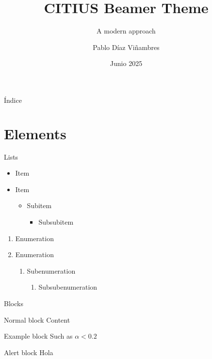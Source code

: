 \documentclass[aspectratio=169]{beamer}
\title{CITIUS Beamer Theme}
\subtitle{A modern approach}
\author{Pablo Díaz Viñambres}
\date{Junio 2025}
\def\toctitle{Índice}
\begin{document}
\begin{frame}[plain]%
    \titlepage%
\end{frame}
  
\begin{frame}[plain]{\toctitle}
    \tableofcontents
\end{frame}
\setcounter{framenumber}{0} %

\section{Elements}

\begin{frame}{Lists}
    \begin{itemize}
        \item Item 
        \item Item
        \begin{itemize}
            \item Subitem
            \begin{itemize}
                \item Subsubitem
            \end{itemize}
        \end{itemize}
    \end{itemize}
    
    \begin{enumerate}
        \item Enumeration 
        \item Enumeration
        \begin{enumerate}
            \item Subenumeration
            \begin{enumerate}
                \item Subsubenumeration
            \end{enumerate}
        \end{enumerate}
    \end{enumerate}
\end{frame}

\begin{frame}{Blocks}
    \begin{block}{Normal block}
        Content
    \end{block}
    \begin{exampleblock}{Example block}
        Such as $\alpha < 0.2$
    \end{exampleblock}
    \begin{alertblock}{Alert block}
        Hola
    \end{alertblock}
\end{frame}
\end{document}
